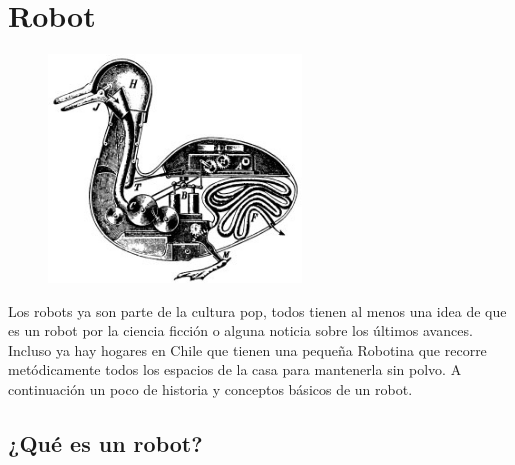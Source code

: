 


\chapter{Robot} %

\label{Chapter2} %




\begin{figure}[htbp]
	\centering
		\includegraphics[width=0.6\textwidth]{./Figures/Duck_of_Vaucanson.jpg}
	\label{fig:Duck}
\end{figure}

Los robots ya son parte de la cultura pop, todos tienen al menos una idea de que es un robot por la ciencia ficción o  alguna noticia sobre los últimos avances. Incluso ya hay hogares en Chile que tienen una pequeña Robotina que recorre metódicamente todos los espacios de la casa para mantenerla sin polvo. A continuación un poco de historia y conceptos básicos de un robot.

\section{¿Qué es un robot?}

